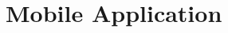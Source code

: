 
\section{Mobile Application}

\hypertarget{mobile_CodeDocumentation}
{
    \label{mobile_CodeDocumentation}
}
